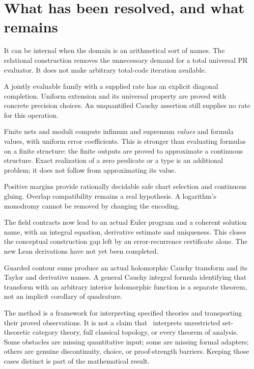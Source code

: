 \section{What has been resolved, and what remains}\label{sec:ledger}

\begin{description}[style=nextline]
\item[Quantification over continuous objects.]
It can be internal when the domain is an arithmetical sort of names. The
relational construction removes the unnecessary demand for a total universal
PR evaluator. It does not make arbitrary total-code iteration available.
\item[Completion and coherence.]
A jointly evaluable family with a supplied rate has an explicit diagonal
completion. Uniform extension and its universal property are proved with
concrete precision choices. An unquantified Cauchy assertion still supplies
no rate for this operation.
\item[Compactness in continuous model theory.]
Finite nets and moduli compute infimum and supremum \emph{values} and formula
values, with uniform error coefficients. This is stronger than evaluating
formulas on a finite structure: the finite outputs are proved to approximate
a continuous structure. Exact realization of a zero predicate or a type is
an additional problem; it does not follow from approximating its value.
\item[Local and global analytic domains.]
Positive margins provide rationally decidable safe chart selection and
continuous gluing. Overlap compatibility remains a real hypothesis. A
logarithm's monodromy cannot be removed by changing the encoding.
\item[ODE realization.]
The field contracts now lead to an actual Euler program and a coherent
solution name, with an integral equation, derivative estimate and uniqueness.
This closes the conceptual construction gap left by an error-recurrence
certificate alone. The new Lean derivations have not yet been completed.
\item[Complex analytic realization.]
Guarded contour sums produce an actual holomorphic Cauchy transform and its
Taylor and derivative names. A general Cauchy integral formula identifying
that transform with an arbitrary interior holomorphic function is a separate
theorem, not an implicit corollary of quadrature.
\end{description}

The method is a framework for interpreting specified theories and transporting
their proved observations. It is not a claim that \ipra\ interprets unrestricted
set-theoretic category theory, full classical topology, or every theorem of
analysis. Some obstacles are missing quantitative input; some are missing
formal adapters; others are genuine discontinuity, choice, or proof-strength
barriers. Keeping those cases distinct is part of the mathematical result.

